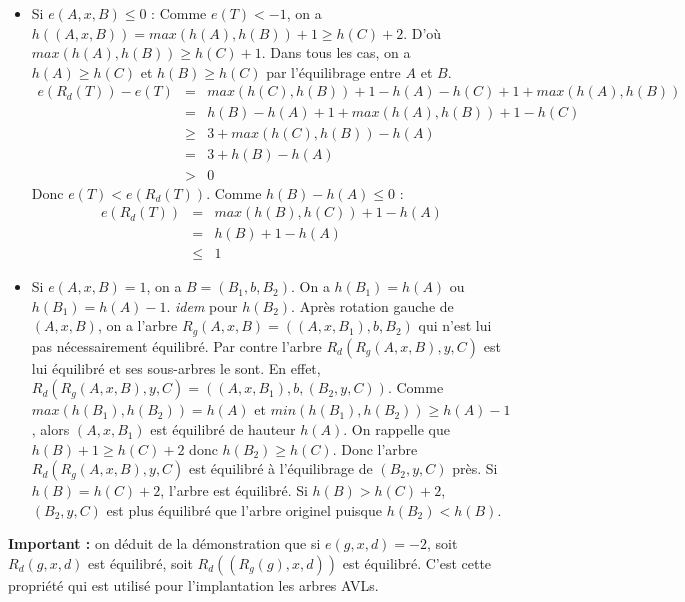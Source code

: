 \documentclass[../../../main.tex]{subfiles}
\begin{document}
\begin{itemize}
	\item Si $e(A, x, B) \leq 0$ :\newline
	Comme $e(T) < -1$, on a $h((A, x, B)) = max(h(A), h(B)) + 1\geq h(C) + 2$. \newline
D'où $max(h(A), h(B)) \geq h(C) + 1$. Dans tous les cas, on a $h(A)\geq h(C)$ et $h(B)\geq h(C)$ par l'équilibrage entre $A$ et $B$.
$$\begin{array}{lcl}
e(R_d(T)) - e(T) & = & max(h(C), h(B)) + 1 - h(A) - h(C) + 1 + max(h(A), h(B)) \\ 
& = & h(B) - h(A) + 1 + max(h(A), h(B)) + 1 - h(C) \\
& \geq & 3 + max(h(C), h(B)) - h(A) \\
& = & 3 + h(B) - h(A)\\ 
& > & 0
\end{array}$$
Donc $e(T) < e(R_d(T))$. Comme $h(B) - h(A) \leq 0$ :
$$\begin{array}{lcl}
e(R_d(T)) & = & max(h(B), h(C)) + 1 - h(A)\\
& = & h(B) + 1 - h(A) \\
& \leq & 1
\end{array}$$
	\item Si $e(A, x, B) = 1$, on a $B = (B_1, b, B_2)$. On a $h(B_1) = h(A)$ ou $h(B_1) = h(A) - 1$. \textit{idem} pour $h(B_2)$. Après rotation gauche de $(A, x, B)$, on a l'arbre $R_g(A, x, B) = ((A, x, B_1), b, B_2)$ qui n'est lui pas nécessairement équilibré. Par contre l'arbre $R_d(R_g(A, x, B), y, C)$ est lui équilibré et ses sous-arbres le sont. \newline
	En effet, $R_d(R_g(A, x, B), y, C) = ((A, x, B_1), b, (B_2, y, C))$. Comme $max(h(B_1), h(B_2)) = h(A)$ et $min(h(B_1), h(B_2)) \geq h(A)-1$, alors $(A, x, B_1)$ est équilibré de hauteur $h(A)$. On rappelle que $h(B) + 1\geq h(C) + 2$ donc $h(B_2)\geq h(C)$. Donc l'arbre $R_d(R_g(A, x, B), y, C)$ est équilibré à l'équilibrage de $(B_2, y, C)$ près. Si $h(B) = h(C) + 2$, l'arbre est équilibré. Si $h(B) > h(C) + 2$, $(B_2, y, C)$ est plus équilibré que l'arbre originel puisque $h(B_2) < h(B)$.
\end{itemize}
\textbf{Important :} on déduit de la démonstration que si $e(g, x, d) = -2$, soit $R_d(g, x, d)$ est équilibré, soit $R_d((R_g(g), x, d))$ est équilibré. C'est cette propriété qui est utilisé pour l'implantation les arbres AVLs.
\end{document}
